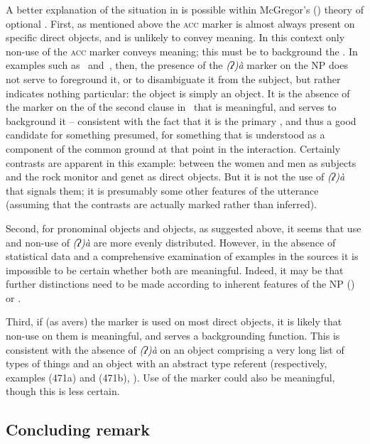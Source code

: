 \documentclass[output=paper]{LSP/langsci}
\begin{document}
A better explanation of the situation in  is possible within McGregor’s (\citeyear{McGregor2010Optional,McGregor2013Optionality}) theory of optional . First, as mentioned above the \textsc{acc} marker is almost always present on specific direct objects, and is unlikely to convey meaning. In this context only non-use of the \textsc{acc} marker conveys meaning; this must be to background the . In examples such as~ and~, then, the presence of the \textit{(ʔ)à} marker on the  NP does not serve to foreground it, or to disambiguate it from the subject, but rather indicates nothing particular: the object is simply an object. It is the absence of the marker on the  of the second clause in~ that is meaningful, and serves to background it – consistent with the fact that it is the primary , and thus a good candidate for something presumed, for something that is understood as a component of the common ground at that point in the interaction. Certainly contrasts are apparent in this example: between the women and men as subjects and the rock monitor and genet as direct objects. But it is not the use of \textit{(ʔ)à} that signals them; it is presumably some other features of the utterance (assuming that the contrasts are actually marked rather than inferred).

Second, for pronominal objects and  objects, as suggested above, it seems that use and non-use of \textit{(ʔ)à} are more evenly distributed. However, in the absence of statistical data and a comprehensive examination of examples in the sources it is impossible to be certain whether both are meaningful. Indeed, it may be that further distinctions need to be made according to \eg inherent features of the NP () or .

Third, if (as \citealt[371]{Kilian-Hatz2013Kxoe} avers) the marker is used on most  direct objects, it is likely that non-use on them is meaningful, and serves a backgrounding function. This is consistent with the absence of \textit{(ʔ)à} on an object comprising a very long list of types of things and an object with an abstract type referent (respectively, examples (471a) and (471b), \citealt[371--372]{Kilian-Hatz2013Kxoe}). Use of the marker could also be meaningful, though this is less certain.

\subsection{Concluding remark} \label{09-mc-sec:3-4}
\end{document}
